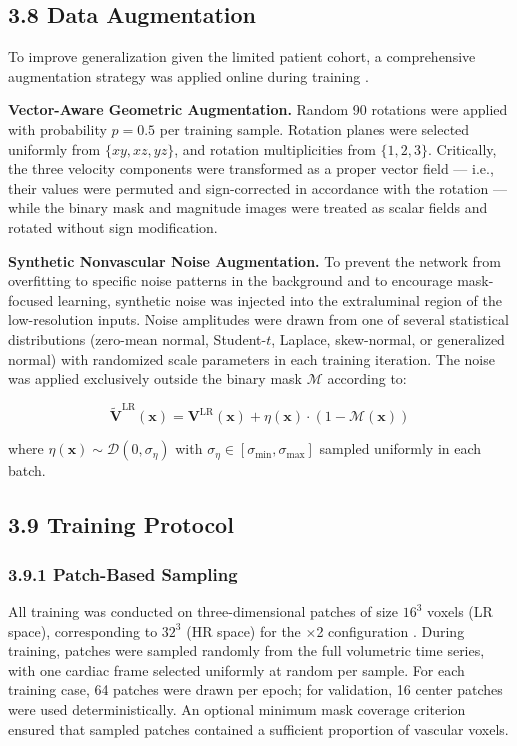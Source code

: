 \subsection*{3.8 Data Augmentation}

To improve generalization given the limited patient cohort, a comprehensive augmentation strategy was applied online during training \cite{zhao2019augmentation}.

\textbf{Vector-Aware Geometric Augmentation.} Random 90\textdegree{} rotations were applied with probability $p = 0.5$ per training sample. Rotation planes were selected uniformly from $\{xy, xz, yz\}$, and rotation multiplicities from $\{1, 2, 3\}$. Critically, the three velocity components were transformed as a proper vector field --- i.e., their values were permuted and sign-corrected in accordance with the rotation --- while the binary mask and magnitude images were treated as scalar fields and rotated without sign modification.

\textbf{Synthetic Nonvascular Noise Augmentation.} To prevent the network from overfitting to specific noise patterns in the background and to encourage mask-focused learning, synthetic noise was injected into the extraluminal region of the low-resolution inputs. Noise amplitudes were drawn from one of several statistical distributions (zero-mean normal, Student-$t$, Laplace, skew-normal, or generalized normal) with randomized scale parameters in each training iteration. The noise was applied exclusively outside the binary mask $\mathcal{M}$ according to:

\begin{equation}
    \tilde{\mathbf{V}}^{\text{LR}}(\mathbf{x}) = \mathbf{V}^{\text{LR}}(\mathbf{x}) + \eta(\mathbf{x}) \cdot (1 - \mathcal{M}(\mathbf{x}))
\end{equation}

where $\eta(\mathbf{x}) \sim \mathcal{D}(0, \sigma_\eta)$ with $\sigma_\eta \in [\sigma_{\min}, \sigma_{\max}]$ sampled uniformly in each batch.

\subsection*{3.9 Training Protocol}

\subsubsection*{3.9.1 Patch-Based Sampling}

All training was conducted on three-dimensional patches of size $16^3$ voxels (LR space), corresponding to $32^3$ (HR space) for the $\times$2 configuration \cite{peiffer2024patch}. During training, patches were sampled randomly from the full volumetric time series, with one cardiac frame selected uniformly at random per sample. For each training case, 64 patches were drawn per epoch; for validation, 16 center patches were used deterministically. An optional minimum mask coverage criterion ensured that sampled patches contained a sufficient proportion of vascular voxels.

